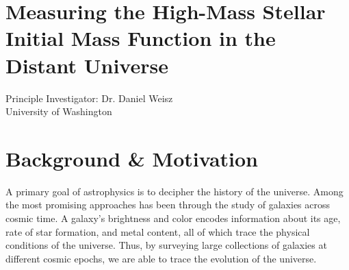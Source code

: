 \documentclass[11pt,preprint]{aastex}
\begin{document}
\section*{\Large Measuring the High-Mass Stellar Initial Mass Function in the Distant Universe}


\begin{center}
Principle Investigator: Dr. Daniel Weisz\\
University of Washington
\end{center}



\section{Background \& Motivation}
\label{sec:overview}

A primary goal of astrophysics is to decipher the history of the universe.  Among the most promising approaches has been through the study of galaxies across cosmic time. A galaxy's brightness and color encodes information about its age, rate of star formation, and metal content, all of which trace the physical conditions of the universe.  Thus, by surveying large collections of galaxies at different cosmic epochs, we are able to trace the evolution of the universe.
\end{document}
